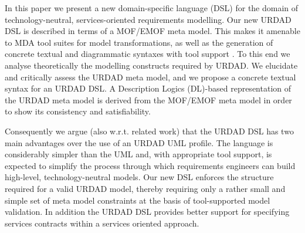 In this paper we present a new domain-specific language (DSL) for the domain of technology-neutral, services-oriented requirements modelling. Our new URDAD DSL is described in terms of a MOF/EMOF meta model. This makes it amenable to MDA tool suites for model transformations, as well as the generation of concrete textual and diagrammatic syntaxes with tool support \cite{gronback_model_2008}. To this end we analyse theoretically the modelling constructs required by URDAD. We elucidate and critically assess the URDAD meta model, and we propose a concrete textual syntax for an URDAD DSL. A Description Logics (DL)-based representation of the URDAD meta model is derived from the MOF/EMOF meta model in order to show its consistency and satisfiability.

Consequently we argue (also w.r.t. related work) that the URDAD DSL has two main advantages over the use of an URDAD UML profile. The language is considerably simpler than the UML and, with appropriate tool support, is expected to simplify the process through which requirements engineers can build high-level, technology-neutral models. Our new DSL enforces the structure required for a valid URDAD model, thereby requiring only a rather small and simple set of meta model constraints at the basis of tool-supported model validation. In addition the URDAD DSL provides better support for specifying services contracts within a services oriented approach.


